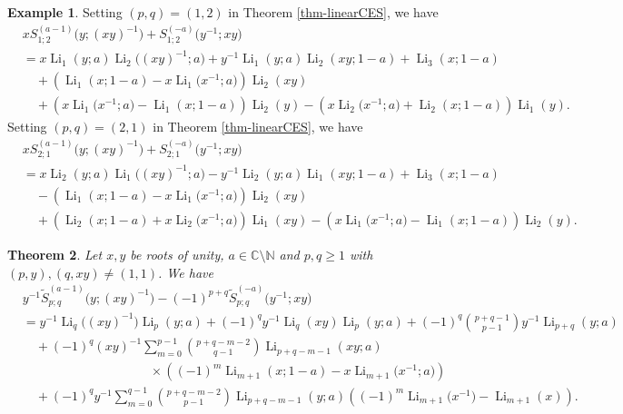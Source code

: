 \documentclass[11pt]{article}
\DeclareMathOperator{\Li}{Li}
\def\N{\mathbb{N}}
\theoremstyle{plain}
\newtheorem{thm}{Theorem}[section]
\theoremstyle{definition}
\newtheorem{exa}[thm]{Example}
\begin{document}
\begin{exa}Setting $(p,q)=(1,2)$ in Theorem \ref{thm-linearCES}, we have
	\begin{align*}
	&xS_{1;2}^{(a-1)}\Big(y;(xy)^{-1}\Big)+S_{1;2}^{(-a)}\Big(y^{-1};xy\Big)\nonumber\\
	&=x \Li_{1}(y;a)\Li_2\Big((xy)^{-1};a\Big)+y^{-1}\Li_1(y;a)\Li_2(xy;1-a)+\Li_{3}(x;1-a)\\
		&\quad+\left(\Li_{1}(x;1-a)-x\Li_{1}\Big(x^{-1};a\Big)\right)\Li_{2}(xy)\nonumber\\
		&\quad+\left(x\Li_{1}\Big(x^{-1};a\Big)-\Li_{1}(x;1-a)\right)\Li_{2}(y)-\left(x\Li_{2}\Big(x^{-1};a\Big)+\Li_{2}(x;1-a)\right)\Li_{1}(y).
	\end{align*}
	Setting $(p,q)=(2,1)$ in Theorem \ref{thm-linearCES}, we have
	\begin{align*}
	&x S_{2;1}^{(a-1)}\Big(y;(xy)^{-1}\Big)+S_{2;1}^{(-a)}\Big(y^{-1};xy\Big)\nonumber\\
	&=x \Li_{2}(y;a)\Li_1\Big((xy)^{-1};a\Big)-y^{-1} \Li_2(y;a)\Li_1(xy;1-a)+\Li_{3}(x;1-a)\\
	&\quad-\left(\Li_{1}(x;1-a)-x\Li_{1}\Big(x^{-1};a\Big)\right)\Li_{2}(xy)\nonumber\\
	&\quad+\left(\Li_{2}(x;1-a)+x\Li_{2}\Big(x^{-1};a\Big)\right)\Li_{1}(xy)-\left(x\Li_{1}\Big(x^{-1};a\Big)-\Li_{1}(x;1-a)\right)\Li_{2}(y).
	\end{align*}
\end{exa}

\begin{thm}\label{thm-linearCES-2} Let $x,y$ be roots of unity, $a\in \mathbb{C}\setminus \N$ and $p,q\geq 1$ with $(p,y), (q,xy)\neq (1,1)$. We have
\begin{align}
&y^{-1}\tilde{S}^{(a-1)}_{p;q}\Big(y;(xy)^{-1}\Big)-(-1)^{p+q} \tilde{S}^{(-a)}_{p;q}\Big(y^{-1};xy\Big)\nonumber\\
&=y^{-1}\Li_q\Big((xy)^{-1}\Big)\Li_p(y;a)+(-1)^q y^{-1}\Li_{q}(xy)\Li_p(y;a)+(-1)^q\binom{p+q-1}{p-1}y^{-1}\Li_{p+q}(y;a)\nonumber\\
&\quad+(-1)^q (xy)^{-1}\sum_{m=0}^{p-1} \binom{p+q-m-2}{q-1}\Li_{p+q-m-1}(xy;a)\nonumber\\&\qquad\qquad\qquad\qquad\qquad\times\left((-1)^m\Li_{m+1}(x;1-a)-x \Li_{m+1}\Big(x^{-1};a\Big)\right)\nonumber\\
&\quad+(-1)^q y^{-1} \sum_{m=0}^{q-1} \binom{p+q-m-2}{p-1}\Li_{p+q-m-1}(y;a)\left((-1)^m \Li_{m+1}\Big(x^{-1}\Big)-\Li_{m+1}(x)\right).
\end{align}
\end{thm}
\end{document}
